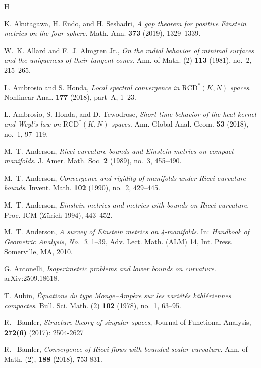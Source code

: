 \documentclass[11pt,reqno]{amsart}
\numberwithin{equation}{section}
\theoremstyle{definition}
\theoremstyle{remark}
\begin{document}
\newpage



\begin{thebibliography}{H}


K. Akutagawa, H. Endo, and H. Seshadri,
\textit{A gap theorem for positive Einstein metrics on the four-sphere}.
Math. Ann. \textbf{373} (2019), 1329--1339.

W.~K. Allard and F.~J. Almgren Jr.,
\textit{On the radial behavior of minimal surfaces and the uniqueness of their tangent cones}.
Ann. of Math. (2) \textbf{113} (1981), no.~2, 215--265.

L. Ambrosio and S. Honda,
\textit{Local spectral convergence in $\mathrm{RCD}^\ast(K,N)$ spaces}.
Nonlinear Anal. \textbf{177} (2018), part~A, 1--23.

L. Ambrosio, S. Honda, and D. Tewodrose,
\textit{Short-time behavior of the heat kernel and Weyl’s law on $\mathrm{RCD}^\ast(K,N)$ spaces}.
Ann. Global Anal. Geom. \textbf{53} (2018), no.~1, 97--119.

M.~T. Anderson,
{\textit{Ricci curvature bounds and Einstein metrics on compact manifolds}}.
J. Amer. Math. Soc. \textbf{2} (1989), no.~3, 455--490.

M.~T. Anderson,
\textit{Convergence and rigidity of manifolds under Ricci curvature bounds}.
Invent. Math. \textbf{102} (1990), no.~2, 429--445.

M.~T. Anderson,
\textit{Einstein metrics and metrics with bounds on Ricci curvature}.
Proc. ICM (Zürich 1994), 443--452.

M.~T. Anderson,
\textit{A survey of Einstein metrics on 4-manifolds}.
In: \emph{Handbook of Geometric Analysis, No.~3}, 1--39,
Adv. Lect. Math. (ALM) 14, Int. Press, Somerville, MA, 2010.

G. Antonelli,
\textit{Isoperimetric problems and lower bounds on curvature}.
arXiv:2509.18618.

T. Aubin,
\textit{Équations du type Monge--Ampère sur les variétés kählériennes compactes}.
Bull. Sci. Math. (2) \textbf{102} (1978), no.~1, 63--95.

R.~ Bamler, \textit{Structure theory of singular spaces}, Journal of Functional Analysis, \textbf{272(6)} (2017): 2504-2627

R.~ Bamler, \textit{Convergence of Ricci flows with bounded scalar curvature}. Ann. of Math. (2), \textbf{188} (2018), 753-831.


\end{thebibliography}
\end{document}
